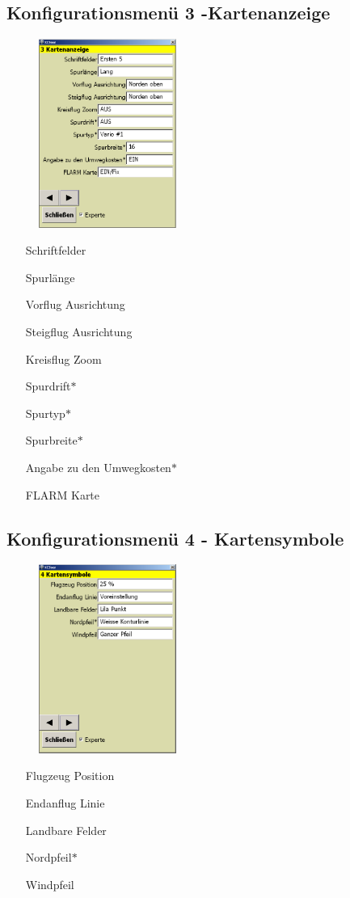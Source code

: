 \subsection{Konfigurationsmenü 3 -Kartenanzeige}\label{Konfig3}
\begin{figure}
\includegraphics[width=4.5cm]{Bilder/Konfig3Kartenanzeige.png}
\end{figure}
\begin{enumerate}
\item[Schriftfelder]
\item[Spurlänge]
\item[Vorflug Ausrichtung]
\item[Steigflug Ausrichtung]
\item[Kreisflug Zoom]
\item[Spurdrift$\ast$]
\item[Spurtyp$\ast$]
\item[Spurbreite$\ast$]
\item[Angabe zu den Umwegkosten$\ast$]
\item[FLARM Karte]

\end{enumerate}

\subsection{Konfigurationsmenü 4 - Kartensymbole}\label{Konfig4}
\begin{figure}
\includegraphics[width=4.5cm]{Bilder/Konfig4Kartensymbole.png}
\end{figure}
\begin{enumerate}
\item[Flugzeug Position]
\item[Endanflug Linie]
\item[Landbare Felder]
\item[Nordpfeil$\ast$]
\item[Windpfeil]
\end{enumerate}

